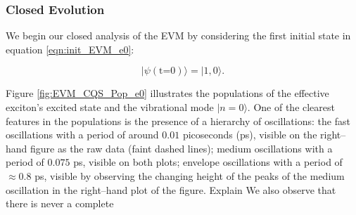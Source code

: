 \documentclass[11pt]{article}
\newcounter{subsubsubsection}[subsubsection]
\begin{document}
\subsubsection{Closed Evolution}


We begin our closed analysis of the EVM by considering the first initial state in equation \eqref{eqn:init_EVM_e0}:

\begin{equation*}
    |\psi (\text{t=0})\rangle = |1, 0\rangle.
\end{equation*}

\noindent Figure \ref{fig:EVM_CQS_Pop_e0} illustrates the populations of the effective exciton's excited state and the vibrational mode $|n=0\rangle$. One of the clearest features in the populations is the presence of a hierarchy of oscillations: the fast oscillations with a period of around $0.01$ picoseconds (ps), visible on the right--hand figure as the raw data (faint dashed lines); medium oscillations with a period of $0.075$ ps, visible on both plots; envelope oscillations with a period of $\approx 0.8$ ps, visible by observing the changing height of the peaks of the medium oscillation in the right--hand plot of the figure. 
Explain
We also observe that there is never a complete 
\end{document}
